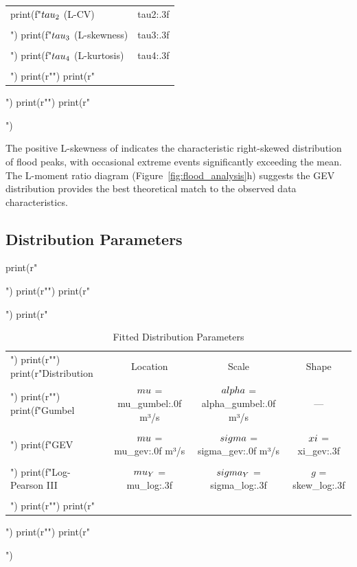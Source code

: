 \documentclass[a4paper, 11pt]{article}
\begin{document}
\begin{pycode}
\begin{table}[htbp]
\begin{tabular}{lc}
print(f"$\\tau_2$ (L-CV) & {tau2:.3f} \\\\")
print(f"$\\tau_3$ (L-skewness) & {tau3:.3f} \\\\")
print(f"$\\tau_4$ (L-kurtosis) & {tau4:.3f} \\\\")
print(r"\bottomrule")
print(r"\end{tabular}")
print(r"\label{tab:statistics}")
print(r"\end{table}")
\end{pycode}

The positive L-skewness of  indicates the characteristic right-skewed
distribution of flood peaks, with occasional extreme events significantly exceeding the mean.
The L-moment ratio diagram (Figure~\ref{fig:flood_analysis}h) suggests the GEV distribution
provides the best theoretical match to the observed data characteristics.

\subsection{Distribution Parameters}

\begin{pycode}
print(r"\begin{table}[htbp]")
print(r"\centering")
print(r"\caption{Fitted Distribution Parameters}")
print(r"\begin{tabular}{lccc}")
print(r"\toprule")
print(r"Distribution & Location & Scale & Shape \\")
print(r"\midrule")
print(f"Gumbel & $\\mu$ = {mu_gumbel:.0f} m³/s & $\\alpha$ = {alpha_gumbel:.0f} m³/s & --- \\\\")
print(f"GEV & $\\mu$ = {mu_gev:.0f} m³/s & $\\sigma$ = {sigma_gev:.0f} m³/s & $\\xi$ = {xi_gev:.3f} \\\\")
print(f"Log-Pearson III & $\\mu_Y$ = {mu_log:.3f} & $\\sigma_Y$ = {sigma_log:.3f} & $g$ = {skew_log:.3f} \\\\")
print(r"\bottomrule")
print(r"\end{tabular}")
print(r"\label{tab:parameters}")
print(r"\end{table}")
\end{pycode}
\end{document}
